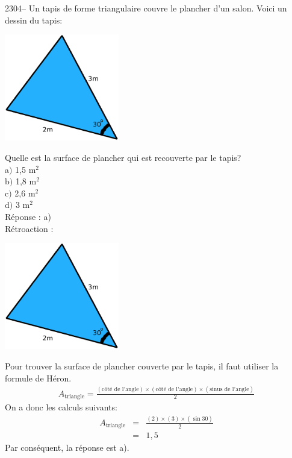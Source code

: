 \documentclass[letterpaper, 12pt]{article}
\begin{document}
2304-- Un tapis de forme triangulaire couvre le plancher d'un salon. Voici un dessin du tapis:
\begin{center}
 \includegraphics[width=5cm,bb=14 14 431 380]{Q2304.eps}
\end{center}
Quelle est la surface de plancher qui est recouverte par le tapis?\\

a$)$ 1,5 m$^{2}$\\
b$)$ 1,8 m$^{2}$\\
c$)$ 2,6 m$^{2}$\\
d$)$ 3 m$^{2}$\\

R\'eponse : a)\\

R\'etroaction :
\begin{center}
 \includegraphics[width=5cm,bb=14 14 431 380]{Q2304.eps}
\end{center}
Pour trouver la surface de plancher couverte par le tapis, il faut utiliser la formule de H\'eron.
\begin{eqnarray*}
A_{\textrm{triangle}}=\frac{(\textrm{c\^ot\'e de l'angle})\times(\textrm{c\^ot\'e de l'angle})\times(\textrm{sinus de l'angle})}{2}
\end{eqnarray*}
On a donc les calculs suivants:
 \begin{eqnarray*}
A_{\textrm{triangle}}&=&\frac{(2)\times(3)\times(\sin{30})}{2}\\
&=&1,5
\end{eqnarray*}
Par cons\'equent, la r\'eponse est a).\\
\end{document}
